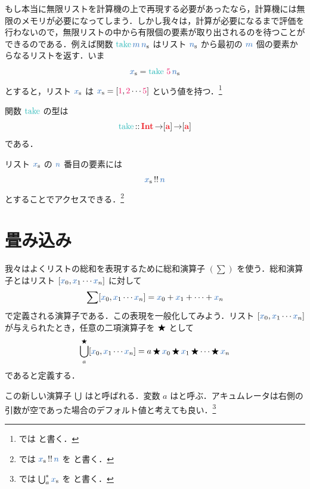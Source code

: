 \documentclass[a5paper,twoside,fleqn,draft]{jsbook}
\begin{document}
もし本当に無限リストを計算機の上で再現する必要があったなら，計算機には無限のメモリが必要になってしまう．しかし我々は，計算が必要になるまで評価を行わないので，無限リストの中から有限個の要素が取り出されるのを待つことができるのである．例えば関数 $\hTake\hVar{m}\,\hListVar{n}$ はリスト $\hListVar{n}$ から最初の $\hVar{m}$ 個の要素からなるリストを返す．いま
\begin{equation*}
  \hListVar{x}
  =\hTake\,\hConstant{5}\,\hListVar{n}
\end{equation*}
とすると，リスト $\hListVar{x}$ は $\hListVar{x}=[\hConstant{1},\hConstant{2}\dotsb\hConstant{5}]$ という値を持つ．\footnote{\haskell では  と書く．}

関数 $\hTake$ の型は
\begin{equation}
  \hTake
  \hIsTypeOf\hInt\hFunctionArrow\hListConstruct{\hTypeName{a}}\hFunctionArrow\hListConstruct{\hTypeName{a}}
\end{equation}
である．

\separator

リスト $\hListVar{x}$ の $\hVar{n}$ 番目の要素には
\begin{equation}
  \hListVar{x}\mListAt\hVar{n}
\end{equation}
とすることでアクセスできる．\footnote{\haskell では $\hListVar{x}\mListAt\hVar{n}$ を  と書く．}

\section{畳み込み}
\label{sec:convolution}

我々はよくリストの総和を表現するために総和演算子 $(\sum)$ を使う．総和演算子とはリスト $[\hVar{x}_0,\hVar{x}_1\dotsb\hVar{x}_n]$ に対して
\begin{equation}
  \sum[\hVar{x}_0,\hVar{x}_1\dotsb \hVar{x}_n]
  =\hVar{x}_0+\hVar{x}_1+\dotsb+\hVar{x}_n
\end{equation}
で定義される演算子である．この表現を一般化してみよう．リスト $[\hVar{x}_0,\hVar{x}_1\dotsb \hVar{x}_n]$ が与えられたとき，任意の二項演算子を $\operatorname{\bigstar}$ として
\begin{equation}
  \mFold^{\hAnyBinOp}_a[\hVar{x}_0,\hVar{x}_1\dotsb \hVar{x}_n]
  =a\hAnyBinOp \hVar{x}_0\hAnyBinOp \hVar{x}_1\hAnyBinOp\dotsb\hAnyBinOp \hVar{x}_n
\end{equation}
であると定義する．

この新しい演算子 $\operatorname*{\bigcup}$ はと呼ばれる．変数 $a$ はと呼ぶ．アキュムレータは右側の引数が空であった場合のデフォルト値と考えても良い．\footnote{\haskell では $\mFold^*_a\hListVar{x}$ を  と書く．}
\end{document}
